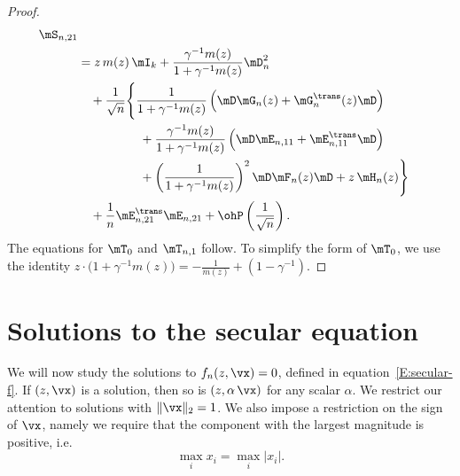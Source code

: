 \begin{proof}
\[\begin{split}
            \mS_{n,21} \\
                &=
                z \, m(z) \, \mI_k
                +
                \frac{\gamma^{-1} m(z)}
                     { 1 + \gamma^{-1} m(z)} \mD_n^2 \\
                &\quad+
                \frac{1}{\sqrt{n}} \Bigg\{
                    \frac{1}{1 + \gamma^{-1} m(z)}
                        \left( 
                            \mD \mG_n(z) 
                            + \mG_n^\trans(z) \mD 
                        \right) \\
                    &\quad\qquad\qquad+
                    \frac{\gamma^{-1} m(z)}{1 + \gamma^{-1} m(z)}
                    \left( \mD \mE_{n,11} + \mE_{n,11}^\trans \mD \right) \\
                    &\quad\qquad\qquad+
                    \left(
                        \frac{1}{1 + \gamma^{-1} m(z)}
                    \right)^2
                    \mD \mF_n(z) \mD
                    +
                    z \, \mH_n( z ) \Bigg\} \\
                &\quad+
                \frac{1}{n} \mE_{n,21}^\trans \mE_{n,21}
                +
                \ohP\left( \frac{1}{\sqrt{n}} \right).
        \end{split}
    \]
    The equations for $\mT_0$ and $\mT_{n,1}$ follow.  
    To simplify the form of $\mT_0$, we use the identity
    \(
        z
        \cdot
        \Big(
            1
            +
            \gamma^{-1} m(z)
        \Big)
        =
        -
        \frac{1}{m(z)}
        +
        (1 - \gamma^{-1}).
    \)
\end{proof}


\section{Solutions to the secular equation}\label{S:solutions-to-secular-eq}

We will now study the solutions to $f_{n}(z, \vx) = 0$, defined in 
equation~\eqref{E:secular-f}.  If $(z, \vx)$
is a solution, then so is $(z, \alpha \, \vx)$ for any scalar $\alpha$.  We restrict our attention to solutions with $\|\vx \|_2 = 1$.  We also impose a restriction on the sign of $\vx$, namely we require that the component with the largest magnitude is positive, i.e.
\begin{equation}\label{E:x-identifiability}
    \max_i x_i = \max_i | x_i |.
\end{equation}

